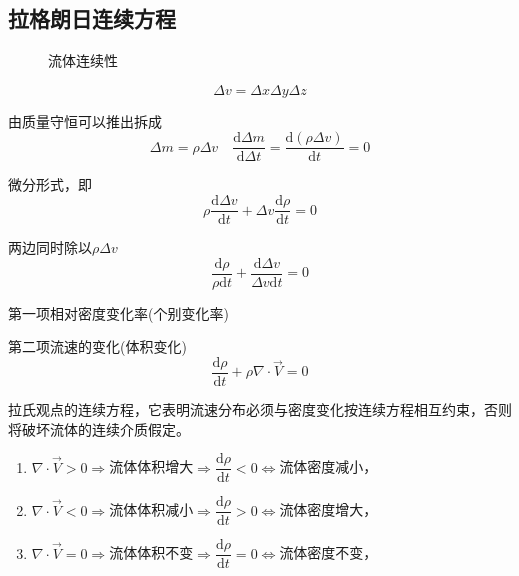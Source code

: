 \documentclass[a4paper,oneside]{ctexbook}
\begin{document}
\subsection{拉格朗日连续方程}
\begin{figure}[htbp]
    \centering
    \caption{流体连续性}
\end{figure}
\begin{equation}\Delta{v}=\Delta{x}\Delta{y}\Delta{z}\end{equation}

由质量守恒可以推出拆成
\begin{equation}
    \Delta{m}=\rho\Delta{v}\quad\dfrac{\mathrm{d}\Delta{m}}{\mathrm{d}\Delta{t}}=\dfrac{\mathrm{d}(\rho\Delta{v})}{\mathrm{d}t}=0
\end{equation}

微分形式，即
\begin{equation}
    \rho\dfrac{\mathrm{d}\Delta{v}}{\mathrm{d}t}+\Delta{v}\dfrac{\mathrm{d}\rho}{\mathrm{d}t}=0
\end{equation}

两边同时除以\(\rho\Delta{v}\)
\begin{equation}
    \dfrac{\mathrm{d}\rho}{\rho\mathrm{d}t}+\dfrac{\mathrm{d}\Delta{v}}{\Delta{v}\mathrm{d}t}=0
\end{equation}

第一项相对密度变化率(个别变化率)

第二项流速的变化(体积变化)
\begin{equation}
    \dfrac{\mathrm{d}\rho}{\mathrm{d}t}+\rho\nabla\cdot\overrightarrow{V}=0
\end{equation}

拉氏观点的连续方程，它表明流速分布必须与密度变化按连续方程相互约束，否则将破坏流体的连续介质假定。
\begin{enumerate}
    \item \(\nabla\cdot\overrightarrow{V}>0\Rightarrow\)流体体积增大\(\Rightarrow\dfrac{\mathrm{d}\rho}{\mathrm{d}t}<0\Leftrightarrow\)流体密度减小，
    \item \(\nabla\cdot\overrightarrow{V}<0\Rightarrow\)流体体积减小\(\Rightarrow\dfrac{\mathrm{d}\rho}{\mathrm{d}t}>0\Leftrightarrow\)流体密度增大，
    \item \(\nabla\cdot\overrightarrow{V}=0\Rightarrow\)流体体积不变\(\Rightarrow\dfrac{\mathrm{d}\rho}{\mathrm{d}t}=0\Leftrightarrow\)流体密度不变，
\end{enumerate}
\end{document}

